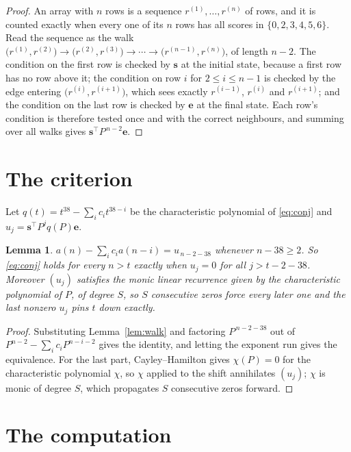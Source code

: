 \documentclass[11pt,a4paper]{article}
\theoremstyle{plain}
\newtheorem{lemma}[theorem]{Lemma}
\theoremstyle{definition}
\begin{document}
\begin{proof}
An array with $n$ rows is a sequence $r^{(1)},\dots,r^{(n)}$ of rows, and it is counted
exactly when every one of its $n$ rows has all scores in $\{0,2,3,4,5,6\}$. Read the sequence as the
walk $\bigl(r^{(1)},r^{(2)}\bigr)\to\bigl(r^{(2)},r^{(3)}\bigr)\to\cdots\to
\bigl(r^{(n-1)},r^{(n)}\bigr)$, of length $n-2$. The condition on the first row is
checked by $\mathbf{s}$ at the initial state, because a first row has no row above it; the
condition on row $i$ for $2\le i\le n-1$ is checked by the edge entering
$\bigl(r^{(i)},r^{(i+1)}\bigr)$, which sees exactly $r^{(i-1)}$, $r^{(i)}$ and
$r^{(i+1)}$; and the condition on the last row is checked by $\mathbf{e}$ at the final
state. Each row's condition is therefore tested once and with the correct neighbours, and
summing over all walks gives $\mathbf{s}^{\!\top}P^{\,n-2}\mathbf{e}$.
\end{proof}

\section{The criterion}

Let $q(t)=t^{38}-\sum_i c_i t^{38-i}$ be the characteristic polynomial of
\eqref{eq:conj} and $u_j=\mathbf{s}^{\!\top}P^{j}q(P)\mathbf{e}$.

\begin{lemma}\label{lem:crit}
$a(n)-\sum_i c_i a(n-i)=u_{\,n-2-38}$ whenever $n-38\ge2$. So \eqref{eq:conj}
holds for every $n>t$ exactly when $u_j=0$ for all $j>t-2-38$. Moreover $(u_j)$
satisfies the monic linear recurrence given by the characteristic polynomial of $P$, of
degree $S$, so $S$ consecutive zeros force every later one and the last nonzero $u_j$ pins
$t$ down exactly.
\end{lemma}

\begin{proof}
Substituting Lemma~\ref{lem:walk} and factoring $P^{\,n-2-38}$ out of
$P^{n-2}-\sum_i c_i P^{n-i-2}$ gives the identity, and letting the exponent run gives the
equivalence. For the last part, Cayley--Hamilton gives $\chi(P)=0$ for the characteristic
polynomial $\chi$, so $\chi$ applied to the shift annihilates $(u_j)$; $\chi$ is monic of
degree $S$, which propagates $S$ consecutive zeros forward.
\end{proof}

\section{The computation}
\end{document}
